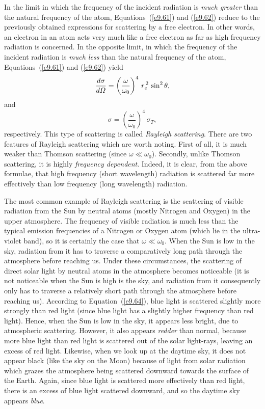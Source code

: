 In the limit in which the frequency of the incident radiation is {\em much greater}\/
than the natural frequency of the atom, Equations~(\ref{e9.61}) and (\ref{e9.62})
reduce to the previously obtained expressions for scattering by
a free electron. In other words, an electron in an atom acts very much
like a free electron as far as high frequency radiation is concerned. 
In the opposite limit, in which the frequency of the incident radiation
is {\em much less}\/ than the natural frequency of the atom, Equations~(\ref{e9.61}) and (\ref{e9.62}) yield
\begin{equation}
\frac{d\sigma}{d{\mit\Omega}} = \left(\frac{\omega}{\omega_0}\right)^4\,r_e^{\,2}\,\sin^2\theta,
\end{equation}
and
\begin{equation}\label{e9.64}
\sigma = \left(\frac{\omega}{\omega_0}\right)^4\,\sigma_T,
\end{equation}
respectively. This type of scattering is called {\em Rayleigh scattering}. There
are two features of Rayleigh scattering which are worth noting. First of
all, it is much weaker than Thomson scattering (since $\omega \ll
\omega_0$). Secondly, unlike Thomson scattering, it is highly
{\em frequency dependent}. Indeed, it is clear, from the above formulae,
that high frequency (short wavelength) radiation is scattered far more
effectively than low frequency (long wavelength) radiation.

The most common example of Rayleigh scattering is the scattering
of visible radiation from the Sun by neutral atoms (mostly Nitrogen and Oxygen) in the upper
atmosphere. The frequency of visible radiation is much less than the
typical emission frequencies of a Nitrogen or Oxygen atom (which lie in the
ultra-violet band), so it is certainly the case that $\omega\ll \omega_0$. 
When the Sun is low in the sky, radiation from it has to traverse a
comparatively long path through the atmosphere before reaching us. Under
these circumstances, the scattering of direct solar light by neutral atoms in the atmosphere
becomes noticeable (it is not noticeable when the Sun is high is the sky,
and radiation from it consequently only has to traverse a relatively
short path through the atmosphere before reaching us). 
According to Equation~(\ref{e9.64}), blue light is scattered slightly
more strongly than red light (since blue light has a slightly higher frequency
than red light). Hence,  when the Sun is low in the sky, it appears less bright,
due to atmospheric scattering. However, it also appears {\em redder}\/ than normal, because
more blue light than red light is scattered out of the solar light-rays, leaving an excess of red light.
Likewise, when we look up at the daytime sky, it does not appear black (like the
sky on the Moon) because of light from solar radiation which grazes
the atmosphere being scattered downward towards the surface of the
Earth. Again, since blue light is scattered more effectively than red light,
there is an excess of blue light scattered downward, and so the daytime sky appears
{\em blue}.

